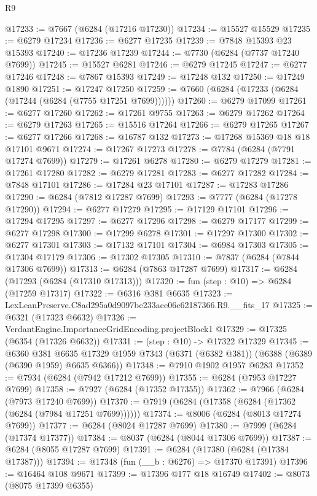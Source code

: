 \begin{lexlean}{R9}
\begin{coremodule}
@17233 := @7667 (@6284 (@17216 @17230))
@17234 := @15527 @15529
@17235 := @6279 @17234
@17236 := @6277 @17235
@17239 := @7848 @15393 @23 @15393
@17240 := @17236 @17239
@17244 := @7730 (@6284 (@7737 @17240 @7699))
@17245 := @15527 @6281
@17246 := @6279 @17245
@17247 := @6277 @17246
@17248 := @7867 @15393
@17249 := @17248 @132
@17250 := @17249 @1890
@17251 := @17247 @17250
@17259 := @7660 (@6284 (@17233 (@6284 (@17244 (@6284 (@7755 @17251 @7699))))))
@17260 := @6279 @17099
@17261 := @6277 @17260
@17262 := @17261 @9755
@17263 := @6279 @17262
@17264 := @6279 @17263
@17265 := @15516 @17264
@17266 := @6279 @17265
@17267 := @6277 @17266
@17268 := @16787 @132
@17273 := @17268 @15369 @18 @18 @17101 @9671
@17274 := @17267 @17273
@17278 := @7784 (@6284 (@7791 @17274 @7699))
@17279 := @17261 @6278
@17280 := @6279 @17279
@17281 := @17261 @17280
@17282 := @6279 @17281
@17283 := @6277 @17282
@17284 := @7848 @17101
@17286 := @17284 @23 @17101
@17287 := @17283 @17286
@17290 := @6284 (@7812 @17287 @7699)
@17293 := @7777 (@6284 (@17278 @17290))
@17294 := @6277 @17279
@17295 := @17129 @17101
@17296 := @17294 @17295
@17297 := @6277 @17296
@17298 := @6279 @17177
@17299 := @6277 @17298
@17300 := @17299 @6278
@17301 := @17297 @17300
@17302 := @6277 @17301
@17303 := @17132 @17101
@17304 := @6984 @17303
@17305 := @17304 @17179
@17306 := @17302 @17305
@17310 := @7837 (@6284 (@7844 @17306 @7699))
@17313 := @6284 (@7863 @17287 @7699)
@17317 := @6284 (@17293 (@6284 (@17310 @17313)))
@17320 := fun (step : @10) => @6284 (@17259 @17317)
@17322 := @6316 @381 @6635
@17323 := LexLeanPreserve.C8ad295a0d9097be233aee06c62187366.R9.__fits_17
@17325 := @6321 (@17323 @6632)
@17326 := VerdantEngine.ImportanceGridEncoding.projectBlock1
@17329 := @17325 (@6354 (@17326 @6632))
@17331 := (step : @10) -> @17322 @17329
@17345 := @6360
    @381
    @6635
    @17329
    @1959
    @7343
    (@6371 (@6382 @381))
    (@6388 (@6389 (@6390 @1959) @6635 @6366))
@17348 := @7910 @1902 @1957 @6283
@17352 := @7934 (@6284 (@7942 @17212 @7699))
@17355 := @6284 (@7953 @17227 @7699)
@17358 := @7927 (@6284 (@17352 @17355))
@17362 := @7966 (@6284 (@7973 @17240 @7699))
@17370 := @7919 (@6284 (@17358 (@6284 (@17362 (@6284 (@7984 @17251 @7699))))))
@17374 := @8006 (@6284 (@8013 @17274 @7699))
@17377 := @6284 (@8024 @17287 @7699)
@17380 := @7999 (@6284 (@17374 @17377))
@17384 := @8037 (@6284 (@8044 @17306 @7699))
@17387 := @6284 (@8055 @17287 @7699)
@17391 := @6284 (@17380 (@6284 (@17384 @17387)))
@17394 := @17348 (fun (__b : @6276) => @17370 @17391)
@17396 := @16464 @108 @9671
@17399 := @17396 @177 @18 @16749
@17402 := @8073 (@8075 @17399 @6355)

\end{coremodule}
\end{lexlean}
